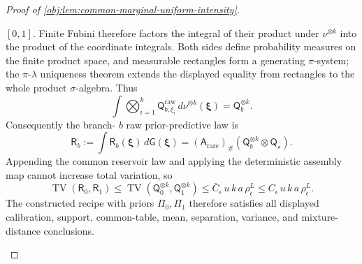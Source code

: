 \documentclass[11pt]{article}
\begin{document}
\begin{proof}[Proof of \cref{obj:lem:common-marginal-uniform-intensity}]
\begin{enumerate}
\([0,1]\). Finite Fubini therefore factors the integral of their product under
\(\nu^{\otimes k}\) into the product of the coordinate integrals. Both sides define probability
measures on the finite product space, and measurable rectangles form a generating \(\pi\)-system;
the \(\pi\)-\(\lambda\) uniqueness theorem extends the displayed equality from rectangles to the
whole product \(\sigma\)-algebra. Thus
\[
\int \bigotimes_{i=1}^k
\mathsf Q^{\mathrm{raw}}_{b,\xi_i}\,d\nu^{\otimes k}(\boldsymbol\xi)
=
\mathsf Q_b^{\otimes k}.
\]
Consequently the branch-
\(b\) raw prior-predictive law is
\[
\mathsf R_b
:=
\int \mathsf R_b(\boldsymbol\xi)\,d\mathsf G(\boldsymbol\xi)
=
(\mathsf A_{\mathrm{rare}})_\#\left(\mathsf Q_b^{\otimes k}\otimes\mathsf Q_\star\right).
\]
Appending the common reservoir law and applying the deterministic assembly map cannot increase total variation, so
\[
\operatorname{TV}(\mathsf R_0,\mathsf R_1)
\le
\operatorname{TV}(\mathsf Q_0^{\otimes k},\mathsf Q_1^{\otimes k})
\le
\bar C_\epsilon\,u\,k\,a\,\rho_\epsilon^L
\le
C_\epsilon\,u\,k\,a\,\rho_\epsilon^L .
\]
The constructed recipe with priors \(\Pi_0,\Pi_1\) therefore satisfies all displayed calibration, support, common-table, mean, separation, variance, and mixture-distance conclusions. %
\end{enumerate}
\end{proof}
\end{document}
